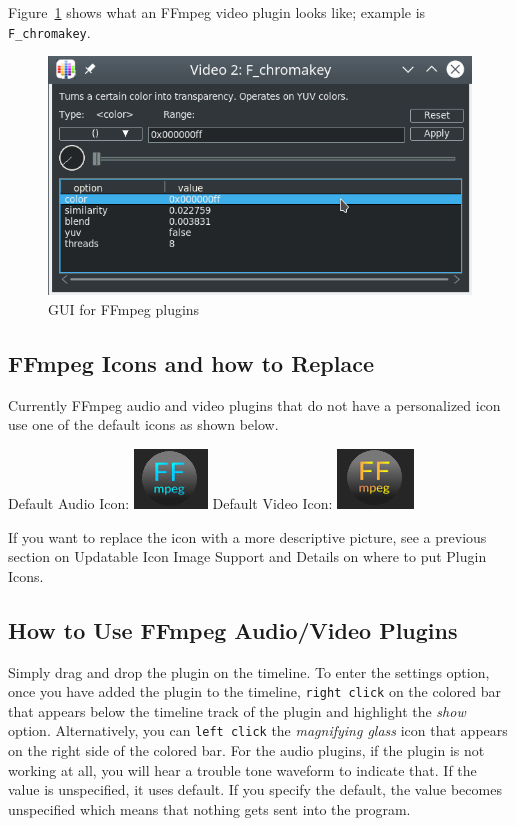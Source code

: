 Figure~\ref{fig:ffchromakey} shows what an FFmpeg video plugin looks like; example is \texttt{F\_chromakey}.

\begin{figure}[htpb]
    \centering
    \includegraphics[width=0.6\linewidth]{images/ffchromakey.png}
    \caption{GUI for FFmpeg plugins}
    \label{fig:ffchromakey}
\end{figure}

\subsection{FFmpeg Icons and how to Replace}%
\label{sub:ffmpeg_icons_how_replace}

Currently FFmpeg audio and video plugins that do not have a personalized icon use one of the default icons as shown below.

Default Audio Icon: \quad \includegraphics[height=\baselineskip]{images/ffaudio.png}
\quad Default Video Icon: \quad \includegraphics[height=\baselineskip]{images/ffvideo.png}

If you want to replace the icon with a more descriptive picture, see a previous section on Updatable Icon Image Support and Details on where to put Plugin Icons.

\subsection{How to Use FFmpeg Audio/Video Plugins}%
\label{sub:use_ffmpeg_audio_video_plugins}

Simply drag and drop the plugin on the timeline. To enter the settings option, once you have added the plugin to the timeline, \texttt{right click} on the colored bar that appears below the timeline track of the plugin and highlight the \textit{show} option. Alternatively, you can \texttt{left click} the \textit{magnifying glass} icon that appears on the right side of the colored bar. For the audio plugins, if the plugin is not working at all, you will hear a trouble tone waveform to indicate that. If the value is unspecified, it uses default. If you specify the default, the value becomes unspecified which means that nothing gets sent into the program.

